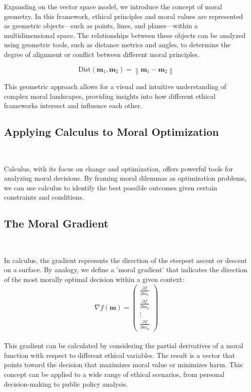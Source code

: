 \documentclass{article}
\begin{document}
Expanding on the vector space model, we introduce the concept of moral geometry. In this framework, ethical principles and moral values are represented as geometric objects—such as points, lines, and planes—within a multidimensional space. The relationships between these objects can be analyzed using geometric tools, such as distance metrics and angles, to determine the degree of alignment or conflict between different moral principles.

\[
\text{Dist}(\mathbf{m}_1, \mathbf{m}_2) = \left\lVert \mathbf{m}_1 - \mathbf{m}_2 \right\rVert
\]

This geometric approach allows for a visual and intuitive understanding of complex moral landscapes, providing insights into how different ethical frameworks intersect and influence each other.

\subsection{Applying Calculus to Moral Optimization}
\

Calculus, with its focus on change and optimization, offers powerful tools for analyzing moral decisions. By framing moral dilemmas as optimization problems, we can use calculus to identify the best possible outcomes given certain constraints and conditions.
\\
\subsection{The Moral Gradient}
\

In calculus, the gradient represents the direction of the steepest ascent or descent on a surface. By analogy, we define a 'moral gradient' that indicates the direction of the most morally optimal decision within a given context:
\\

\[
\nabla f(\mathbf{m}) = \begin{pmatrix}
\frac{\partial f}{\partial m_1} \\
\frac{\partial f}{\partial m_2} \\
\vdots \\
\frac{\partial f}{\partial m_n}
\end{pmatrix}
\]
\\

This gradient can be calculated by considering the partial derivatives of a moral function with respect to different ethical variables. The result is a vector that points toward the decision that maximizes moral value or minimizes harm. This concept can be applied to a wide range of ethical scenarios, from personal decision-making to public policy analysis.
\\
\end{document}
